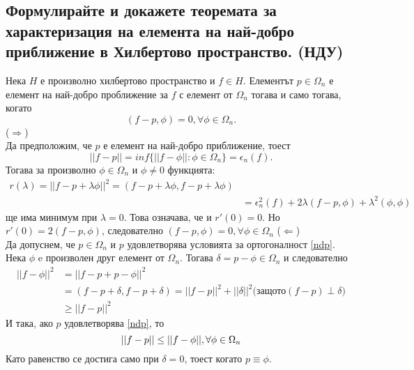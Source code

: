 \documentclass[12pt]{article}
\numberwithin{equation}{subsection}
\numberwithin{theorem}{subsection}
\numberwithin{definition}{subsection}
\numberwithin{corollary}{subsection}
\begin{document}
\subsection{Формулирайте и докажете теоремата за характеризация на елемента на най-добро приближение в Хилбертово пространство. (НДУ)}
  \theorem
  Нека $H$ е произволно хилбертово пространство и $f\in H$. Елементът $p\in\Omega_n$ е елемент на най-добро проближение за $f$ с елемент от $\Omega_n$ тогава и само тогава, когато
  \begin{equation}\label{ndp}
    (f-p,\phi)=0, \forall\phi\in\Omega_n.
  \end{equation}
  \proof
  ($\Rightarrow$)\\
  Да предположим, че $p$ е елемент на най-добро приближение, тоест
  \begin{equation*}
    ||f-p||=inf\{||f-\phi||:\phi\in \Omega_n\} = \epsilon_n(f).
  \end{equation*}
  Тогава за произволно $\phi\in\Omega_n$ и $\phi\neq0$ функцията:
  \begin{align*}
    r(\lambda)=||f-p+\lambda\phi||^2=(f-p+\lambda\phi,f-p+\lambda\phi)\\
    &=\epsilon_n^2(f) + 2\lambda(f-p,\phi) +\lambda^2(\phi,\phi)
  \end{align*}
  ще има минимум при $\lambda=0$. Това означава, че и $r'(0)=0$. Но $r'(0)=2(f-p,\phi)$, следователно
  $(f-p,\phi)=0, \forall\phi\in\Omega_n$
  ($\Leftarrow$)\\
  Да допуснем, че $p\in\Omega_n$ и $p$ удовлетворява условията за ортогоналност \ref{ndp}. Нека $\phi$ e произволен друг елемент от $\Omega_n$. Тогава $\delta=p-\phi\in\Omega_n$ и следователно
  \begin{align*}
    ||f-\phi||^2&=||f-p+p-\phi||^2\\&=(f-p+\delta,f-p+\delta)=||f-p||^2+||\delta||^2 \text{(защото} (f-p)\perp\delta)\\
    &\geq||f-p||^2
  \end{align*}
  И така, ако $p$ удовлетворява \ref{ndp}, то
  \begin{equation*}
    ||f-p||\leq||f-\phi||,\hfil\forall\phi\in\Omega_n
  \end{equation*}
  Като равенство се достига само при $\delta=0$, тоест когато $p\equiv\phi$.
\end{document}

